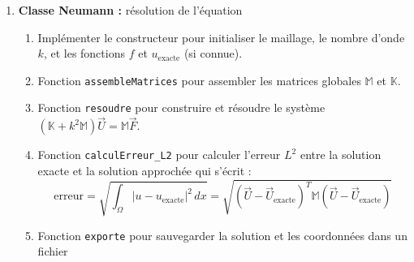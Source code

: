 \documentclass{article}
\begin{document}
\begin{enumerate}[label=\arabic*]
        \item \textbf{Classe Neumann :} résolution de l'équation
        \begin{enumerate}[label=\alph*.]
            \item Implémenter le constructeur pour initialiser le maillage, le nombre d'onde \(k\), et les fonctions \(f\) et \(u_{\text{exacte}}\) (si connue).
            \item Fonction \texttt{assembleMatrices} pour assembler les matrices globales \(\mathbb{M}\) et \(\mathbb{K}\).
            \item Fonction \texttt{resoudre} pour construire et résoudre le système \((\mathbb{K} + k^2 \mathbb{M}) \vec{U} = \mathbb{M} \vec{F}\).
            \item Fonction \texttt{calculErreur\_L2} pour calculer l'erreur \(L^2\) entre la solution exacte et la solution approchée qui s'écrit : 
                \[
                \text{erreur} = \sqrt{\int_{\Omega} |u - u_{\text{exacte}}|^2 \, dx} = \sqrt{ (\vec{U} - \vec{U}_{\text{exacte}})^T \mathbb{M} (\vec{U} - \vec{U}_{\text{exacte}}) }
                \]
            \item Fonction \texttt{exporte} pour sauvegarder la solution et les coordonnées dans un fichier 
        \end{enumerate}

    \end{enumerate}
\end{document}
